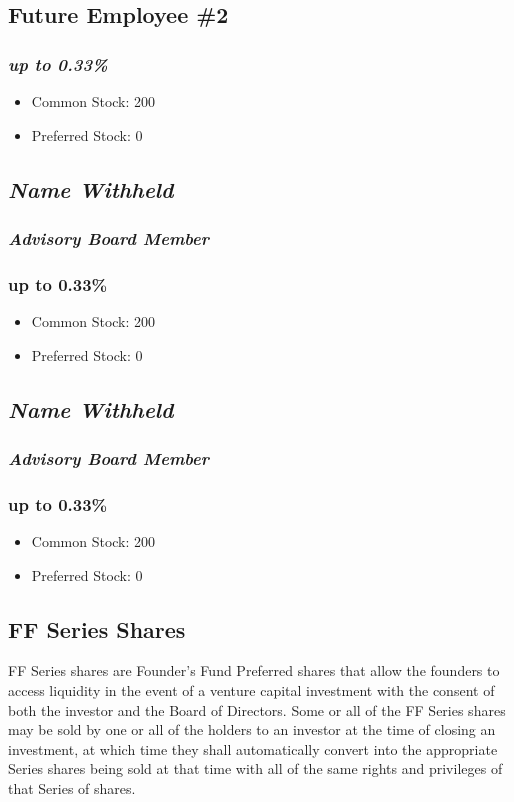 \documentclass[11pt]{report}
\begin{document}
\subsection{Future Employee \#2}
	\subsubsection{\emph{up to 0.33\%}}
	\begin{itemize}
		\item Common Stock: 200
		\item Preferred Stock: 0
	\end{itemize}
\subsection{\emph{Name Withheld}}
	\subsubsection{\textit{Advisory Board Member}}
	\subsubsection{up to 0.33\%}
		\begin{itemize}
			\item Common Stock: 200
			\item Preferred Stock: 0
		\end{itemize}
\subsection{\emph{Name Withheld}}
	\subsubsection{\textit{Advisory Board Member}}
	\subsubsection{up to 0.33\%}
	\begin{itemize}
		\item Common Stock: 200
		\item Preferred Stock: 0
	\end{itemize}
\subsection{FF Series Shares}
\label{ff-series-shares}{\small FF Series shares are Founder's Fund Preferred shares that allow the founders to access liquidity in the event of a venture capital investment with the consent of both the investor and the Board of Directors. Some or all of the FF Series shares may be sold by one or all of the holders to an investor at the time of closing an investment, at which time they shall automatically convert into the appropriate Series shares being sold at that time with all of the same rights and privileges of that Series of shares.\cite{ff-shares}}
\end{document}
